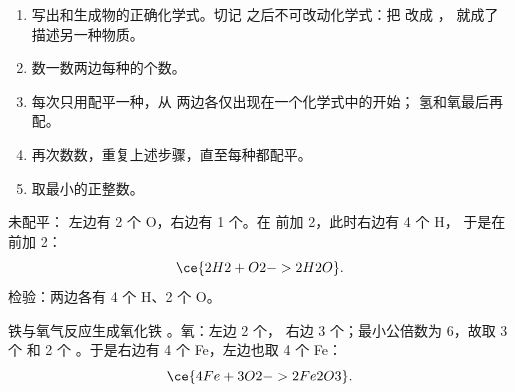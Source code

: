 \begin{method}[配平化学方程式]\label{met:g8:balanced-equations:balance}
\begin{enumerate}
  \item 写出和生成物的正确化学式。切记
        之后不可改动化学式：把  改成 ，
        就成了描述另一种物质。
  \item 数一数两边每种的个数。
  \item 每次只用配平一种，从
        两边各仅出现在一个化学式中的开始；
        氢和氧最后再配。
  \item 再次数数，重复上述步骤，直至每种都配平。
  \item {}取最小的正整数。
\end{enumerate}
\end{method}

\begin{example}[氢和氧]\label{ex:g8:balanced-equations:water}
未配平： %
左边有 2 个 O，右边有 1 个。在  前加 2，此时右边有 4 个 H，
于是在  前加 2：
\[
  \ce{2H2 + O2 -> 2H2O}.
\]
检验：两边各有 4 个 H、2 个 O。
\end{example}

\begin{example}[铁在氧气中燃烧]\label{ex:g8:balanced-equations:iron-oxide}
铁与氧气反应生成氧化铁 。氧：左边 2 个，
右边 3 个；最小公倍数为 6，故取 3 个  和 2 个
。于是右边有 4 个 Fe，左边也取 4 个 Fe：
\[
  \ce{4Fe + 3O2 -> 2Fe2O3}.
\]
\end{example}

